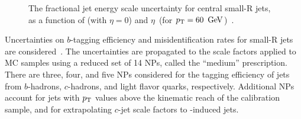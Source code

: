\begin{figure}[tb]
\centering
{}
\caption[Fractional jet energy scale uncertainty for small-R jets]{The fractional jet energy scale uncertainty for central small-R jets, as a function of \protect{} \pt (with $\eta=0$) and \protect{} $\eta$\, (for $\pT=60\,\GeV$)~\cite{jes_unc}.}
\label{fig:jes_unc}
\end{figure}

Uncertainties on $b$-tagging efficiency and misidentification rates for small-R jets are considered~\cite{b_jet, b_jet_opt}. The uncertainties are propagated to the scale factors applied to MC samples using a reduced set of 14 NPs, called the ``medium'' prescription. There are three, four, and five NPs considered for the tagging efficiency of jets from $b$-hadrons, $c$-hadrons, and light flavor quarks, respectively. Additional NPs account for jets with $p_{\text{T}}$ values above the kinematic reach of the calibration sample, and for extrapolating $c$-jet scale factors to \tau-induced jets. %

%
